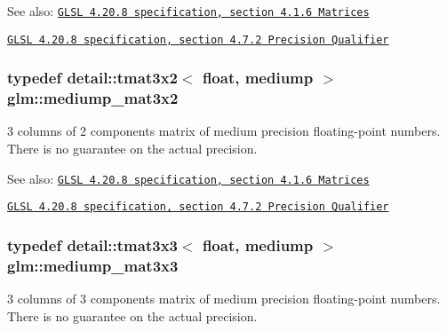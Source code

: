 \begin{Desc}
\item[See also:]\href{http://www.opengl.org/registry/doc/GLSLangSpec.4.20.8.pdf}{\tt GLSL 4.20.8 specification, section 4.1.6 Matrices} 

\href{http://www.opengl.org/registry/doc/GLSLangSpec.4.20.8.pdf}{\tt GLSL 4.20.8 specification, section 4.7.2 Precision Qualifier} \end{Desc}
\hypertarget{group__core__precision_g1215b70c2750b6e9ab813ced8dcae568}{
\subsubsection[mediump\_\-mat3x2]{\setlength{\rightskip}{0pt plus 5cm}typedef detail::tmat3x2$<$ float, mediump $>$ {\bf glm::mediump\_\-mat3x2}}}
\label{group__core__precision_g1215b70c2750b6e9ab813ced8dcae568}


3 columns of 2 components matrix of medium precision floating-point numbers. There is no guarantee on the actual precision.

\begin{Desc}
\item[See also:]\href{http://www.opengl.org/registry/doc/GLSLangSpec.4.20.8.pdf}{\tt GLSL 4.20.8 specification, section 4.1.6 Matrices} 

\href{http://www.opengl.org/registry/doc/GLSLangSpec.4.20.8.pdf}{\tt GLSL 4.20.8 specification, section 4.7.2 Precision Qualifier} \end{Desc}
\hypertarget{group__core__precision_ge4c7f0d5d3dab712f9a671183e63e5ab}{
\subsubsection[mediump\_\-mat3x3]{\setlength{\rightskip}{0pt plus 5cm}typedef detail::tmat3x3$<$ float, mediump $>$ {\bf glm::mediump\_\-mat3x3}}}
\label{group__core__precision_ge4c7f0d5d3dab712f9a671183e63e5ab}


3 columns of 3 components matrix of medium precision floating-point numbers. There is no guarantee on the actual precision.

